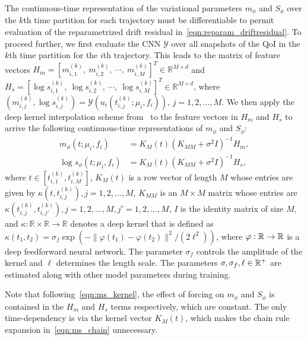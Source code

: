 \documentclass{article}
\begin{document}
	The continuous-time representation of the variational parameters $m_\phi$ and $S_\phi$ over the $k$th time partition for each trajectory must be differentiable to permit evaluation of the reparametrized drift residual in~\eqref{eqn:reparam_driftresidual}. To proceed further, we first evaluate the CNN $\mathcal{Y}$ over all snapshots of the QoI in the $k$th time partition for the $i$th trajectory. This leads to the matrix of feature vectors $H_m = [ m_{i,1}^{(k)},~m_{i,2}^{(k)},~ \cdots,~ m_{i,M}^{(k)} ]^T \in \mathbb{R}^{M \times d}$ and $H_s = [ \log s_{i,1}^{(k)},~ \log s_{i,2}^{(k)},~\cdots, ~\log s_{i,M}^{(k)}	]^T \in \mathbb{R}^{M \times d}$, where $(m_{i,j}^{(k)}, \log s_{i,j}^{(k)} ) = \mathcal{Y}(u_i(t_{i,j}^{(k)}; \mu_i, f_i))$, $j=1,2,\ldots,M$. We then apply the deep kernel interpolation scheme from~\cite{Course_2023_Amortized_Reparameterization} to the feature vectors in $H_m$ and $H_s$ to arrive the following continuous-time representations of $m_\phi$ and $S_\phi$:
	\begin{equation} \label{eqn:ms_kernel}
		\begin{aligned}
			m_\phi(t; \mu_i, f_i) & = K_{M}(t) 
			\left( K_{MM} + \sigma^2  I\right)^{-1} H_m, \\
			\log s_\phi(t; \mu_i, f_i) & = K_{M}(t) 
			\left( K_{MM} + \sigma^2 I\right)^{-1} H_s,
		\end{aligned}
	\end{equation}
	where $t \in [t_{i,1}^{(k)}, t_{i,M}^{(k)}]$, $K_M(t)$ is a row vector of length $M$ whose entries are given by $\kappa(t, t_{i,j}^{(k)}), j=1,2,\ldots,M$, $K_{MM}$ is an $M\times M$ matrix whose entries are $\kappa(t_{i,j}^{(k)}, t_{i,j'}^{(k)}), j=1,2,\ldots,M,j'=1,2,\ldots,M$, $I$ is the identity matrix of size $M$, and $\kappa: \mathbb{R} \times \mathbb{R} \rightarrow \mathbb{R}$ denotes a deep kernel that is defined as $\kappa(t_1, t_2) = \sigma_f \exp\left(-\|\varphi(t_1) - \varphi(t_2)\|^2/(2\ell^2)\right)$, where $\varphi: \mathbb{R}^{} \rightarrow \mathbb{R}^{}$ is a deep feedforward neural network. The parameter $\sigma_f$ controls the amplitude of the kernel and $\ell$ determines the length scale. The parameters $\sigma, \sigma_f, \ell \in \mathbb{R}^{+}$ are estimated along with other model parameters during training.
	
	Note that following~\eqref{eqn:ms_kernel}, the effect of forcing on $m_\phi$ and $S_\phi$ is contained in the $H_m$ and $H_s$ terms respectively, which are constant. The only time-dependency is via the kernel vector $K_M(t)$, which makes the chain rule expansion in~\eqref{eqn:ms_chain} unnecessary.
	
\end{document}
